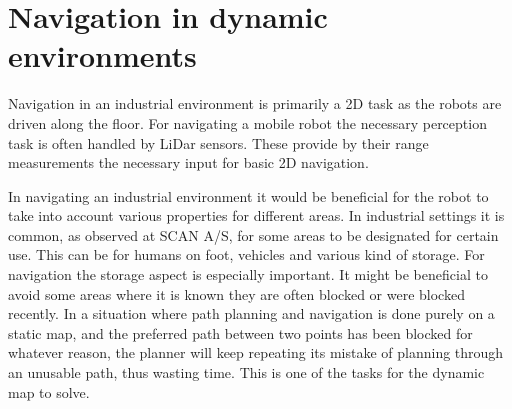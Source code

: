 \section{Navigation in dynamic environments}
Navigation in an industrial environment is primarily a 2D task as the robots are driven along the floor. For navigating a mobile robot the necessary perception task is often handled by LiDar sensors. These provide by their range measurements the necessary input for basic 2D navigation. 

In navigating an industrial environment it would be beneficial for the robot to take into account various properties for different areas. In industrial settings it is common, as observed at SCAN A/S, for some areas to be designated for certain use. This can be for humans on foot, vehicles and various kind of storage. For navigation the storage aspect is especially important. It might be beneficial to avoid some areas where it is known they are often blocked or were blocked recently.
In a situation where path planning and navigation is done purely on a static map, and the preferred path between two points has been blocked for whatever reason, the planner will keep repeating its mistake of planning through an unusable path, thus wasting time. This is one of the tasks for the dynamic map to solve.

